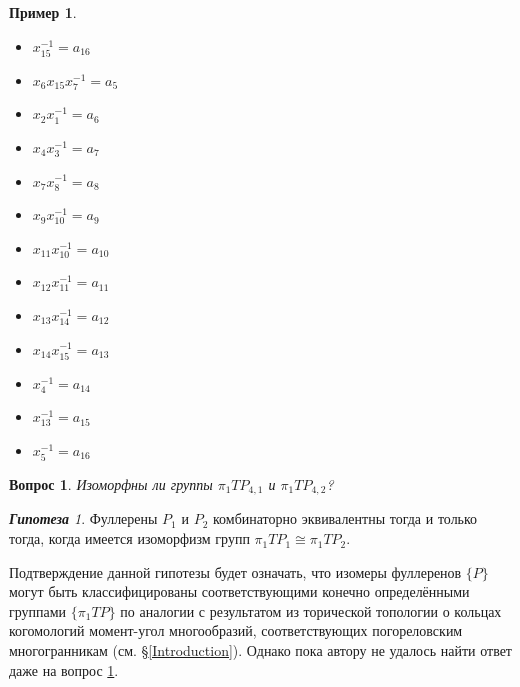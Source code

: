 \documentclass[14pt, dvipsnames, twoside]{extarticle}
\newtheorem{question}{Вопрос}
\theoremstyle{definition}
\newtheorem{example}{Пример}
\theoremstyle{remark}
\newtheorem*{hypothesis}{\bf Гипотеза}
\begin{document}
\begin{example}
\begin{multicols}{2}
\begin{itemize}
\item $x_{15}^{-1} = a_{16}$



\end{itemize}

\columnbreak

\begin{itemize}

\item $x_6x_{15}x_7^{-1} = a_5$



\item $x_2x_1^{-1} = a_6$

\item $x_4x_3^{-1} = a_7$

\item $x_7x_8^{-1} = a_8$

\item $x_9x_{10}^{-1} = a_{9}$

\item $x_{11}x_{10}^{-1} = a_{10}$

\item $x_{12}x_{11}^{-1} = a_{11}$

\item $x_{13}x_{14}^{-1} = a_{12}$

\item $x_{14}x_{15}^{-1} = a_{13}$




\item $x_4^{-1} = a_{14}$

\item $x_{13}^{-1} = a_{15}$

\item $x_5^{-1} = a_{16}$


\end{itemize}



\end{multicols}




\begin{question}\label{QUESTION}
Изоморфны ли группы $\pi_1TP_{4, 1}$ и $\pi_1TP_{4, 2}$?
\end{question}

\begin{hypothesis}
Фуллерены $P_1$ и $P_2$ комбинаторно эквивалентны тогда и только тогда, когда имеется изоморфизм групп $\pi_1TP_1\cong \pi_1 TP_2$. 
\end{hypothesis}

Подтверждение данной гипотезы будет означать, что изомеры фуллеренов $\{P\}$ могут быть классифицированы соответствующими конечно определёнными группами $\{\pi_1TP\}$ по аналогии с результатом из торической топологии о кольцах когомологий момент-угол многообразий, соответствующих погореловским многогранникам (см. \S\ref{Introduction}). Однако пока автору не удалось найти ответ даже на вопрос \ref{QUESTION}.   



\end{example}
\end{document}
